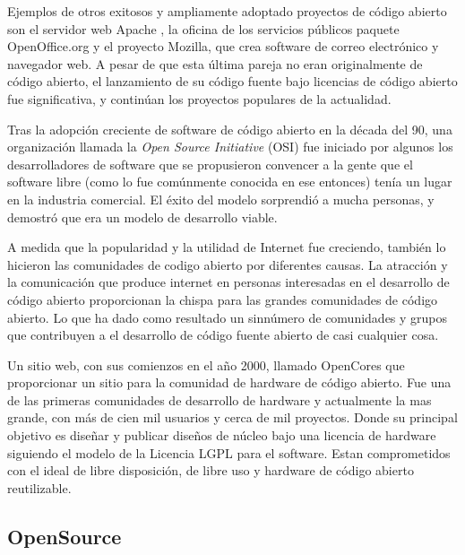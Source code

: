 Ejemplos de otros exitosos y ampliamente adoptado proyectos de código abierto son el servidor web Apache , la oficina de los servicios públicos paquete OpenOffice.org y el proyecto Mozilla, que crea software de correo electrónico y navegador web. A pesar de que esta última pareja no eran originalmente de código abierto, el lanzamiento de su código fuente bajo licencias de código abierto fue significativa, y continúan los proyectos populares de la actualidad.

Tras la adopción creciente de software de código abierto en la década del 90, una organización llamada la \textit{Open Source Initiative} (OSI) fue iniciado por algunos los desarrolladores de software que se propusieron convencer a la gente que el software libre (como lo fue comúnmente conocida en ese entonces) tenía un lugar en la industria comercial. El éxito del modelo sorprendió a mucha personas, y demostró que era un modelo de desarrollo viable.  

A medida que la popularidad y la utilidad de Internet fue creciendo, también lo hicieron las  comunidades de codigo abierto por diferentes causas. La atracción y la comunicación que produce internet en personas interesadas en el desarrollo de código abierto proporcionan la chispa para las grandes comunidades de código abierto. Lo que ha dado como resultado un sinnúmero de comunidades y  grupos que contribuyen a el desarrollo de código fuente abierto de casi cualquier cosa.

Un sitio web, con sus comienzos en el año 2000, llamado OpenCores que proporcionar un sitio para la comunidad de hardware de código abierto. Fue una de las primeras comunidades de desarrollo de hardware y actualmente la mas grande, con más de cien mil usuarios y cerca de mil proyectos. Donde su principal objetivo es diseñar y publicar diseños de núcleo bajo una licencia de hardware siguiendo el modelo de la Licencia LGPL para el software. Estan comprometidos con el ideal de libre disposición, de libre uso y hardware de código abierto reutilizable.%

\subsection{OpenSource}


